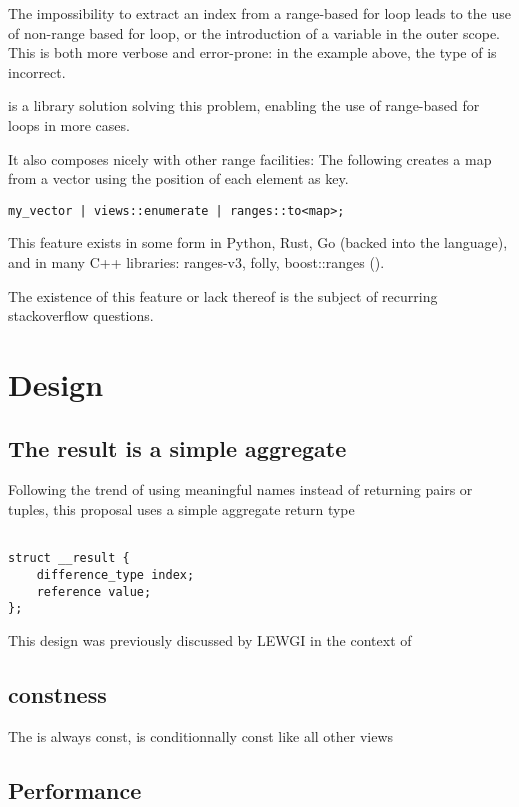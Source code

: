 \documentclass{wg21}
\begin{document}
The impossibility to extract an index from a range-based for loop leads to the use of non-range based for loop, 
or the introduction of a variable in the outer scope. This is both more verbose and error-prone: in the example above, the type of  is incorrect. 

 is a library solution solving this problem, enabling the use of range-based for loops in more cases.

It also composes nicely with other range facilities:
The following creates a map from a vector using the position of each element as key.
 
\begin{lstlisting}
my_vector | views::enumerate | ranges::to<map>;
\end{lstlisting}

This feature exists in some form in Python, Rust, Go (backed into the language), and in many C++ libraries: ranges-v3, folly, boost::ranges ().


The existence of this feature or lack thereof is the subject of recurring stackoverflow questions.  


\section{Design}

\subsection{The result is a simple aggregate}

Following the trend of using meaningful names instead of returning pairs or tuples, this proposal uses a simple aggregate return type

\begin{lstlisting}

struct __result {
    difference_type index;
    reference value;
};
\end{lstlisting}

This design was previously discussed by LEWGI in the context of \cite{P1894R0}

\subsection{constness}

The  is always const,  is conditionnally const like all other views

\subsection{Performance}
\end{document}
